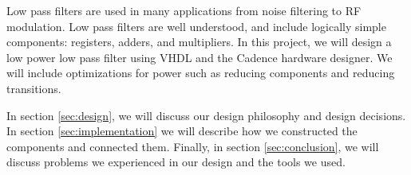 
Low pass filters are used in many applications from noise filtering to RF modulation.  Low pass filters are well understood, and include logically simple components: registers, adders, and multipliers.  In this project, we will design a low power low pass filter using VHDL and the Cadence hardware designer.  We will include optimizations for power such as reducing components and reducing transitions.

In section \ref{sec:design}, we will discuss our design philosophy and design decisions.  In section \ref{sec:implementation} we will describe how we constructed the components and connected them.  Finally, in section \ref{sec:conclusion}, we will discuss problems we experienced in our design and the tools we used.



